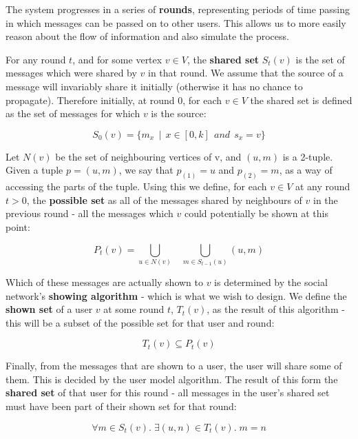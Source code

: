 \documentclass[bsc,frontabs,twoside,singlespacing,parskip,deptreport]{infthesis}     %
\begin{document}
The system progresses in a series of \textbf{rounds}, representing periods of time passing in which messages can be passed on to other users. This allows us to more easily reason about the flow of information and also simulate the process.

For any round $t$, and for some vertex $v \in V$, the \textbf{shared set} $S_{t}(v)$ is the set of messages which were shared by $v$ in that round. We assume that the source of a message will invariably share it initially (otherwise it has no chance to propagate). Therefore initially, at round 0, for each $v \in V$ the shared set is defined as the set of messages for which $v$ is the source:

\begin{equation}
S_{0}(v) = \{m_{x} \:\: | \:\: x \in [0, k] \:\: and \:\: s_{x} = v\}
\end{equation}


Let $N(v)$ be the set of neighbouring vertices of v, and $(u, m)$ is a 2-tuple. Given a tuple $p = (u, m)$, we say that $p_{(1)} = u$ and $p_{(2)} = m$, as a way of accessing the parts of the tuple. Using this we define, for each $v \in V$ at any round $t > 0$, the \textbf{possible set} as all of the messages shared by neighbours of $v$ in the previous round - all the messages which $v$ could potentially be shown at this point:

\begin{equation}
P_{t}(v) = \bigcup_{u \in N(v)} \:\:\:\: \bigcup_{m \in S_{t-1}(u)} (u, m)
\end{equation}

Which of these messages are actually shown to $v$ is determined by the social network's \textbf{showing algorithm} - which is what we wish to design. We define the \textbf{shown set} of a user $v$ at some round $t$, $T_{t}(v)$, as the result of this algorithm - this will be a subset of the possible set for that user and round:

\begin{equation}
T_{t}(v) \subseteq P_{t}(v)
\end{equation}

Finally, from the messages that are shown to a user, the user will share some of them. This is decided by the user model algorithm. The result of this form the \textbf{shared set} of that user for this round - all messages in the user's shared set must have been part of their shown set for that round:

\begin{equation}
\forall m \in S_{t}(v) .\; \exists (u, n) \in T_{t}(v) .\; m = n
\end{equation}
\end{document}
